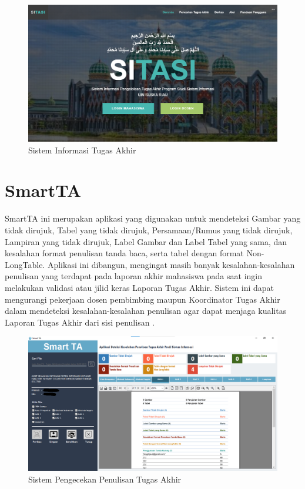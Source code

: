 \begin{figure}
	\centering
	\includegraphics[width=0.82\linewidth]{konten//gambar/sitasi.png}
	\caption{Sistem Informasi Tugas Akhir \protect\cite{web-prodi}}
	\label{fig:enter-label}
\end{figure}

\section{SmartTA}
SmartTA ini merupakan aplikasi yang digunakan untuk mendeteksi Gambar yang tidak dirujuk, Tabel yang tidak dirujuk, Persamaan/Rumus yang tidak dirujuk, Lampiran yang tidak dirujuk, Label Gambar dan Label Tabel yang sama, dan kesalahan format penulisan tanda baca, serta tabel dengan format Non-LongTable. Aplikasi ini dibangun, mengingat masih banyak kesalahan-kesalahan penulisan yang terdapat pada laporan akhir mahasiswa pada saat ingin melakukan validasi atau jilid keras Laporan Tugas Akhir. Sistem ini dapat mengurangi pekerjaan dosen pembimbing maupun Koordinator Tugas Akhir dalam mendeteksi kesalahan-kesalahan penulisan agar dapat menjaga kualitas Laporan Tugas Akhir dari sisi penulisan \cite{web-prodi}.

\begin{figure}
	\centering
	\includegraphics[width=0.82\linewidth]{konten//gambar/smartta.png}
	\caption{Sistem Pengecekan Penulisan Tugas Akhir \protect\cite{web-prodi}}
	\label{fig:enter-label}
\end{figure}

